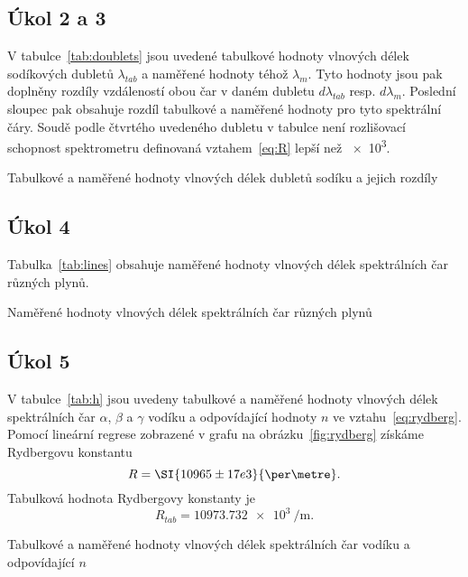 \documentclass{scirep}
\begin{document}
    \subsection*{Úkol 2 a 3}
    V tabulce~\ref{tab:doublets} jsou uvedené tabulkové hodnoty vlnových délek sodíkových dubletů $\lambda_{tab}$ a naměřené hodnoty téhož $\lambda_m$.
    Tyto hodnoty jsou pak doplněny rozdíly vzdáleností obou čar v daném dubletu $d\lambda_{tab}$ resp. $d\lambda_m$.
    Poslední sloupec pak obsahuje rozdíl tabulkové a naměřené hodnoty pro tyto spektrální čáry.
    Soudě podle čtvrtého uvedeného dubletu v tabulce není rozlišovací schopnost spektrometru definovaná vztahem~\eqref{eq:R} lepší než \SI{e3}{}.

    \begin{table}[b]
        \centering
        \setlength{\tabcolsep}{15pt}
        
        \caption{Tabulkové a naměřené hodnoty vlnových délek dubletů sodíku a jejich rozdíly}
        \label{tab:doublets}
    \end{table}

    \subsection*{Úkol 4}
    Tabulka~\ref{tab:lines} obsahuje naměřené hodnoty vlnových délek spektrálních čar různých plynů.

    \begin{table}[b]
        \centering
        \setlength{\tabcolsep}{9pt}
        
        \caption{Naměřené hodnoty vlnových délek spektrálních čar různých plynů}
        \label{tab:lines}
    \end{table}

    \subsection*{Úkol 5}

    V tabulce~\ref{tab:h} jsou uvedeny tabulkové a naměřené hodnoty vlnových délek spektrálních čar $\alpha$, $\beta$ a $\gamma$ vodíku a odpovídající hodnoty $n$ ve vztahu~\eqref{eq:rydberg}.
    Pomocí lineární regrese zobrazené v grafu na obrázku~\ref{fig:rydberg} získáme Rydbergovu konstantu
    \[ R = \SI{10965 \pm 17 e3}{\per\metre}. \]
    Tabulková hodnota Rydbergovy konstanty je
    \[ R_{tab} = \SI{10973.732 e3}{\per\metre}. \]

    \begin{table}[b]
        \centering
        \setlength{\tabcolsep}{15pt}
        
        \caption{Tabulkové a naměřené hodnoty vlnových délek spektrálních čar vodíku a odpovídající $n$}
        \label{tab:h}
    \end{table}
\end{document}
